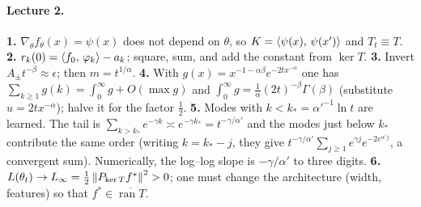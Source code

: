 \paragraph{Lecture 2.}
\textbf{1.} $\nabla_\theta f_\theta(x)=\psi(x)$ does not depend on $\theta$, so $K=\left\langle \psi(x),\,\psi(x')\right\rangle$ and $T_t\equiv T$. \quad
\textbf{2.} $r_k(0)=\left\langle f_0,\,\varphi_k\right\rangle-a_k$; square, sum, and add the constant from $\ker T$. \quad
\textbf{3.} Invert $A_\pm t^{-\beta}\approx\epsilon$; then $m=t^{1/\alpha}$. \quad
\textbf{4.} With $g(x)=x^{-1-\alpha\beta}e^{-2tx^{-\alpha}}$ one has $\sum_{k\ge1}g(k)=\int_0^\infty g+O(\max g)$ and $\int_0^\infty g=\frac1\alpha(2t)^{-\beta}\Gamma(\beta)$ (substitute $u=2tx^{-\alpha}$); halve it for the factor $\tfrac12$. \quad
\textbf{5.} Modes with $k<k_*=\alpha'^{-1}\ln t$ are learned. The tail is $\sum_{k>k_*}e^{-\gamma k}\asymp e^{-\gamma k_*}=t^{-\gamma/\alpha'}$ and the modes just below $k_*$ contribute the same order (writing $k=k_*-j$, they give $t^{-\gamma/\alpha'}\sum_{j\ge1}e^{\gamma j}e^{-2e^{\alpha'j}}$, a convergent sum). Numerically, the log--log slope is $-\gamma/\alpha'$ to three digits. \quad
\textbf{6.} $L(\theta_t)\to L_\infty=\tfrac12\left\lVert P_{\ker T}f^*\right\rVert^2>0$; one must change the architecture (width, features) so that $f^*\in\overline{\operatorname{ran}T}$.

